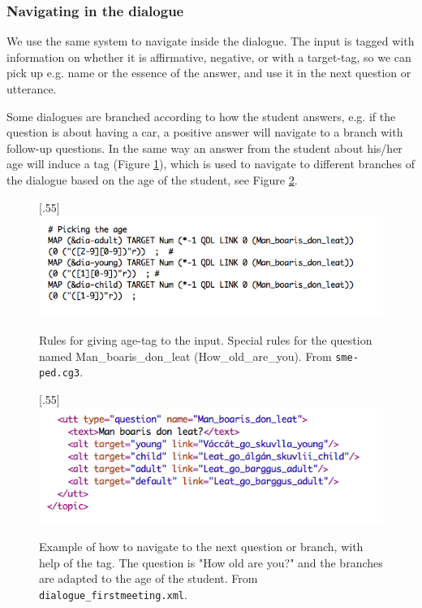 \documentclass[a4paper,12pt]{article}
\begin{document}
\subsubsection{Navigating in the dialogue}
We use the same system to navigate inside the dialogue. The input is tagged with information on whether it is affirmative, negative, or with a target-tag, so we can pick up e.g. name or the essence of the answer, and use it in the next question or utterance. 

Some dialogues are branched according to how the student answers, e.g. if the question is about having a car, a positive answer will navigate to a branch with follow-up questions. In the same way an answer from the student about his/her age will induce a tag (Figure \ref{age}), which is used to navigate to different branches of the dialogue based on the age of the student, see Figure \ref{branch}.


\begin{figure}[htbp]
\begin{center}
\scalebox{.55}[.55]{\includegraphics{img/picking_age.png}}\\
\caption{Rules for giving age-tag to the input. Special rules for the question named Man\_boaris\_don\_leat (How\_old\_are\_you). From \texttt{sme-ped.cg3}.}
\label{age}
\end{center}
\end{figure}


\begin{figure}[htbp]
\begin{center}
\scalebox{.55}[.55]{\includegraphics{img/Man_boaris.png}}\\
\caption{Example of how to navigate to the next question or branch, with help of the tag. The question is "How old are you?" and the branches are adapted to the age of the student. From \texttt{dialogue\_firstmeeting.xml}.}
\label{branch}
\end{center}
\end{figure}
\end{document}
